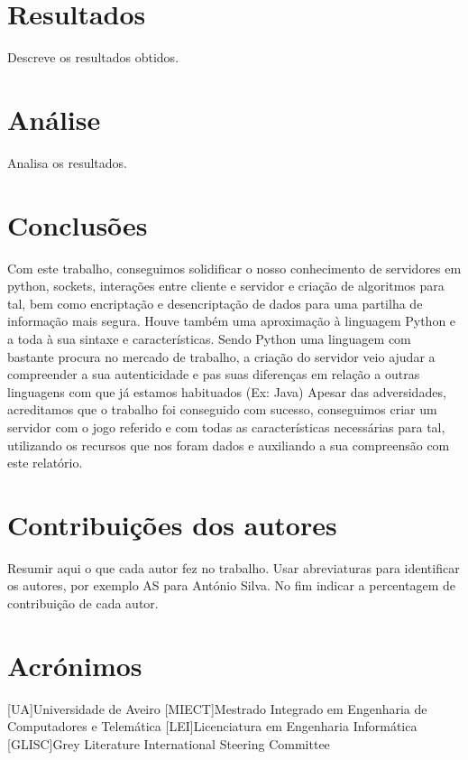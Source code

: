 \documentclass{report}
\begin{document}
\chapter{Resultados}
\label{chap.resultados}
Descreve os resultados obtidos.

\chapter{Análise}
\label{chap.analise}
Analisa os resultados.

\chapter{Conclusões}
\label{chap.conclusao}
Com este trabalho, conseguimos solidificar o nosso conhecimento de servidores em python, sockets, interações entre 
cliente e servidor e criação de algoritmos para tal, bem como encriptação e desencriptação de dados para uma partilha
de informação mais segura. Houve também uma aproximação à linguagem Python e a toda à sua sintaxe e características.
Sendo Python uma linguagem com bastante procura no mercado de trabalho, a criação do servidor veio ajudar a compreender
a sua autenticidade e pas suas diferenças em relação a outras linguagens com que já estamos habituados (Ex: Java)
Apesar das adversidades, acreditamos que o trabalho foi conseguido com sucesso, conseguimos criar um servidor 
com o jogo referido e com todas as características necessárias para tal, utilizando os recursos que nos foram dados
e auxiliando a sua compreensão com este relatório.

\chapter*{Contribuições dos autores}
Resumir aqui o que cada autor fez no trabalho.
Usar abreviaturas para identificar os autores,
por exemplo AS para António Silva.
No fim indicar a percentagem de contribuição de cada autor.

\chapter*{Acrónimos}
\begin{acronym}
[UA]{Universidade de Aveiro}
[MIECT]{Mestrado Integrado em Engenharia de Computadores e Telemática}
[LEI]{Licenciatura em Engenharia Informática}
[GLISC]{Grey Literature International Steering Committee}
\end{acronym}


\printbibliography
\end{document}
